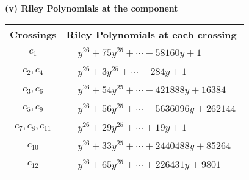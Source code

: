 \documentclass[1p]{elsarticle_modified}
\theoremstyle{definition}
\begin{document}
\flushleft \textbf{(v) Riley Polynomials at the component}\newline \\
\begin{tabular}{m{50pt}|m{274pt}}
Crossings & \hspace{64pt}Riley Polynomials at each crossing \\
\hline $$\begin{aligned}c_{1}\end{aligned}$$&$\begin{aligned}
&y^{26}+75 y^{25}+\cdots-58160 y+1
\end{aligned}$\\
\hline $$\begin{aligned}c_{2},c_{4}\end{aligned}$$&$\begin{aligned}
&y^{26}+3 y^{25}+\cdots-284 y+1
\end{aligned}$\\
\hline $$\begin{aligned}c_{3},c_{6}\end{aligned}$$&$\begin{aligned}
&y^{26}+54 y^{25}+\cdots-421888 y+16384
\end{aligned}$\\
\hline $$\begin{aligned}c_{5},c_{9}\end{aligned}$$&$\begin{aligned}
&y^{26}+56 y^{25}+\cdots-5636096 y+262144
\end{aligned}$\\
\hline $$\begin{aligned}c_{7},c_{8},c_{11}\end{aligned}$$&$\begin{aligned}
&y^{26}+29 y^{25}+\cdots+19 y+1
\end{aligned}$\\
\hline $$\begin{aligned}c_{10}\end{aligned}$$&$\begin{aligned}
&y^{26}+33 y^{25}+\cdots+2440488 y+85264
\end{aligned}$\\
\hline $$\begin{aligned}c_{12}\end{aligned}$$&$\begin{aligned}
&y^{26}+65 y^{25}+\cdots+226431 y+9801
\end{aligned}$\\
\hline
\end{tabular}\\~\\
\end{document}
